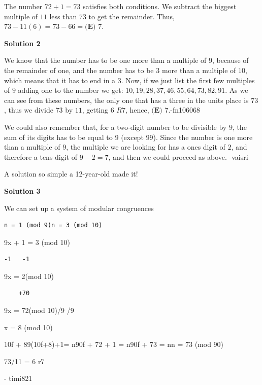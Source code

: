 \begin{enumerate}
 The number $72+1=73$ satisfies both conditions. We subtract the biggest multiple of $11$ less than $73$ to get the remainder. Thus, $73-11(6)=73-66=\boxed{\textbf{(E) }7}$.

 



\textbf{Solution 2}

We know that the number has to be one more than a multiple of $9$, because of the remainder of one, and the number has to be $3$ more than a multiple of $10$, which means that it has to end in a $3$. Now, if we just list the first few multiples of $9$ adding one to the number we get: $10, 19, 28, 37, 46, 55, 64, 73, 82, 91$. As we can see from these numbers,  the only one that has a three in the units place is $73$, thus we divide $73$ by $11$, getting $6$ $R7$, hence, $\boxed{\textbf{(E) }7}$.-fn106068

 We could also remember that, for a two-digit number to be divisible by $9$, the sum of its digits has to be equal to $9$ (except $99$). Since the number is one more than a multiple of $9$, the multiple we are looking for has a ones digit of $2$, and therefore a tens digit of $9-2 = 7$, and then we could proceed as above. -vaisri

 A solution so simple a 12-year-old made it!

 



\textbf{Solution 3}

We can set up a system of modular congruences

 \begin{verbatim}
n = 1 (mod 9)n = 3 (mod 10)
\end{verbatim}

9x + 1 = 3 (mod 10)

 \begin{verbatim}
-1   -1
\end{verbatim}

9x = 2(mod 10)

 \begin{verbatim}
	+70
\end{verbatim}

9x = 72(mod 10)/9  /9

 x = 8 (mod 10)

 10f + 89(10f+8)+1= n90f + 72 + 1 = n90f + 73  = nn = 73 (mod 90)

 73/11 = 6 r7

 - timi821

 



\end{enumerate}
